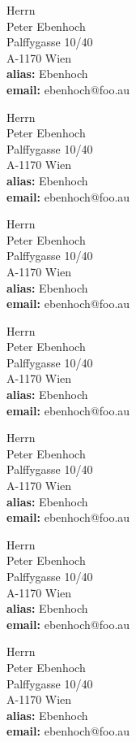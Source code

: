 \parbox{8cm}{
Herrn \\
Peter Ebenhoch \\
Palffygasse 10/40 \\
A-1170 Wien \\
{\bf alias:} Ebenhoch  \\
{\bf email:} ebenhoch@foo.au \\ }

\parbox{8cm}{
Herrn \\
Peter Ebenhoch \\
Palffygasse 10/40 \\
A-1170 Wien \\
{\bf alias:} Ebenhoch  \\
{\bf email:} ebenhoch@foo.au \\ }

\parbox{8cm}{
Herrn \\
Peter Ebenhoch \\
Palffygasse 10/40 \\
A-1170 Wien \\
{\bf alias:} Ebenhoch  \\
{\bf email:} ebenhoch@foo.au \\ }

\parbox{8cm}{
Herrn \\
Peter Ebenhoch \\
Palffygasse 10/40 \\
A-1170 Wien \\
{\bf alias:} Ebenhoch  \\
{\bf email:} ebenhoch@foo.au \\ }

\parbox{8cm}{
Herrn \\
Peter Ebenhoch \\
Palffygasse 10/40 \\
A-1170 Wien \\
{\bf alias:} Ebenhoch  \\
{\bf email:} ebenhoch@foo.au \\ }

\parbox{8cm}{
Herrn \\
Peter Ebenhoch \\
Palffygasse 10/40 \\
A-1170 Wien \\
{\bf alias:} Ebenhoch  \\
{\bf email:} ebenhoch@foo.au \\ }

\parbox{8cm}{
Herrn \\
Peter Ebenhoch \\
Palffygasse 10/40 \\
A-1170 Wien \\
{\bf alias:} Ebenhoch  \\
{\bf email:} ebenhoch@foo.au \\ }




